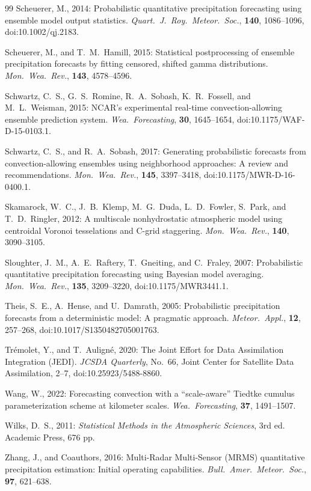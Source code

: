 \documentclass[11pt]{article}
\begin{document}
\begin{thebibliography}{99}
Scheuerer, M., 2014:
Probabilistic quantitative precipitation forecasting using ensemble
model output statistics.
\textit{Quart.\ J.\ Roy.\ Meteor.\ Soc.}, \textbf{140}, 1086--1096,
doi:10.1002/qj.2183.

Scheuerer, M., and T.~M.\ Hamill, 2015:
Statistical postprocessing of ensemble precipitation forecasts by
fitting censored, shifted gamma distributions.
\textit{Mon.\ Wea.\ Rev.}, \textbf{143}, 4578--4596.

Schwartz, C.~S., G.~S.\ Romine, R.~A.\ Sobash, K.~R.\ Fossell,
and M.~L.\ Weisman, 2015:
NCAR's experimental real-time convection-allowing ensemble
prediction system.
\textit{Wea.\ Forecasting}, \textbf{30}, 1645--1654,
doi:10.1175/WAF-D-15-0103.1.

Schwartz, C.~S., and R.~A.\ Sobash, 2017:
Generating probabilistic forecasts from convection-allowing
ensembles using neighborhood approaches: A review and
recommendations.
\textit{Mon.\ Wea.\ Rev.}, \textbf{145}, 3397--3418,
doi:10.1175/MWR-D-16-0400.1.

Skamarock, W.~C., J.~B.\ Klemp, M.~G.\ Duda, L.~D.\ Fowler,
S.\ Park, and T.~D.\ Ringler, 2012:
A multiscale nonhydrostatic atmospheric model using centroidal
Voronoi tesselations and C-grid staggering.
\textit{Mon.\ Wea.\ Rev.}, \textbf{140}, 3090--3105.

Sloughter, J.~M., A.~E.\ Raftery, T.\ Gneiting, and C.\ Fraley, 2007:
Probabilistic quantitative precipitation forecasting using Bayesian
model averaging.
\textit{Mon.\ Wea.\ Rev.}, \textbf{135}, 3209--3220,
doi:10.1175/MWR3441.1.

Theis, S.~E., A.\ Hense, and U.\ Damrath, 2005:
Probabilistic precipitation forecasts from a deterministic model:
A pragmatic approach.
\textit{Meteor.\ Appl.}, \textbf{12}, 257--268,
doi:10.1017/S1350482705001763.

Tr\'emolet, Y., and T.\ Aulign\'e, 2020:
The Joint Effort for Data Assimilation Integration (JEDI).
\textit{JCSDA Quarterly}, No.~66, Joint Center for Satellite Data Assimilation, 2--7,
doi:10.25923/5488-8860.

Wang, W., 2022:
Forecasting convection with a ``scale-aware'' Tiedtke cumulus
parameterization scheme at kilometer scales.
\textit{Wea.\ Forecasting}, \textbf{37}, 1491--1507.

Wilks, D.~S., 2011:
\textit{Statistical Methods in the Atmospheric Sciences}, 3rd ed.
Academic Press, 676 pp.

Zhang, J., and Coauthors, 2016:
Multi-Radar Multi-Sensor (MRMS) quantitative precipitation
estimation: Initial operating capabilities.
\textit{Bull.\ Amer.\ Meteor.\ Soc.}, \textbf{97}, 621--638.

\end{thebibliography}
\end{document}

